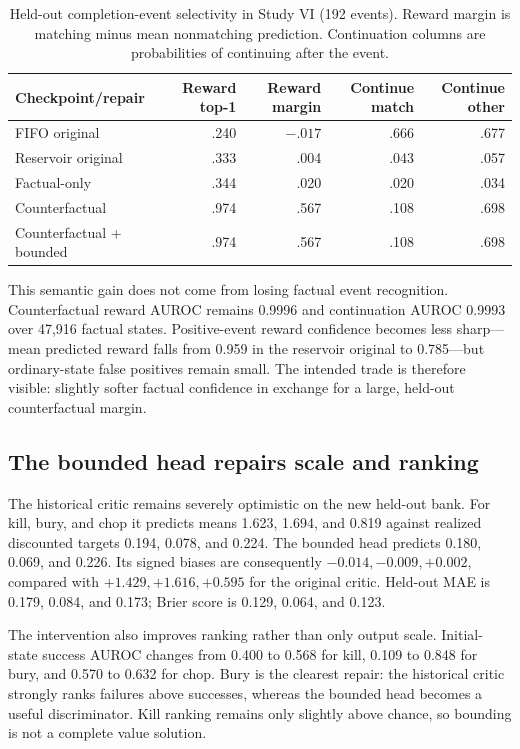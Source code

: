 \documentclass[10pt]{article}
\begin{document}
\begin{table}[H]
\centering
\small
\caption{Held-out completion-event selectivity in Study VI (192 events). Reward margin is matching minus mean nonmatching prediction. Continuation columns are probabilities of continuing after the event.}
\label{tab:stage4heads}
\begin{tabular}{lrrrr}
\toprule
Checkpoint/repair & Reward top-1 & Reward margin & Continue match & Continue other \\
\midrule
FIFO original & .240 & $-.017$ & .666 & .677 \\
Reservoir original & .333 & .004 & .043 & .057 \\
Factual-only & .344 & .020 & .020 & .034 \\
Counterfactual & .974 & .567 & .108 & .698 \\
Counterfactual + bounded & .974 & .567 & .108 & .698 \\
\bottomrule
\end{tabular}
\end{table}

This semantic gain does not come from losing factual event recognition.
Counterfactual reward AUROC remains 0.9996 and continuation AUROC 0.9993 over
47,916 factual states. Positive-event reward confidence becomes less sharp---
mean predicted reward falls from 0.959 in the reservoir original to 0.785---but
ordinary-state false positives remain small. The intended trade is therefore
visible: slightly softer factual confidence in exchange for a large,
held-out counterfactual margin.

\subsection{The bounded head repairs scale and ranking}

The historical critic remains severely optimistic on the new held-out bank.
For kill, bury, and chop it predicts means 1.623, 1.694, and 0.819 against
realized discounted targets 0.194, 0.078, and 0.224. The bounded head predicts
0.180, 0.069, and 0.226. Its signed biases are consequently
$-0.014,-0.009,+0.002$, compared with $+1.429,+1.616,+0.595$ for the original
critic. Held-out MAE is 0.179, 0.084, and 0.173; Brier score is 0.129, 0.064,
and 0.123.

The intervention also improves ranking rather than only output scale.
Initial-state success AUROC changes from 0.400 to 0.568 for kill, 0.109 to
0.848 for bury, and 0.570 to 0.632 for chop. Bury is the clearest repair: the
historical critic strongly ranks failures above successes, whereas the bounded
head becomes a useful discriminator. Kill ranking remains only slightly above
chance, so bounding is not a complete value solution.
\end{document}

